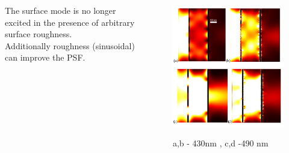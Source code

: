 \documentclass{beamer}
\begin{document}
\begin{frame}
	\begin{columns}
		\begin{column}{0.5\textwidth}
				The surface mode is no longer excited in the presence of arbitrary surface roughness.\\
				Additionally roughness (sinusoidal) can improve the PSF.

				{\tiny \cite{huang2012subwavelength}}
		\end{column}
		\begin{column}{0.5\textwidth}
			\begin{figure}[htb]
				\includegraphics[width=\textwidth]{../images/multilayer/plp-chropo.png}\\
				\caption{ a,b - 430nm , c,d -490 nm}
			\end{figure}
		\end{column}
	\end{columns}
		
\end{frame}
\end{document}
